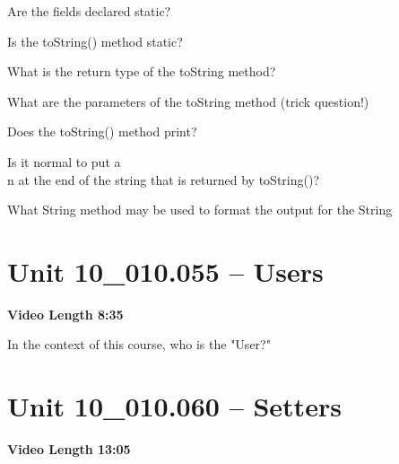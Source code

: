 \documentclass[letterpaper,12pt]{exam}
\newcommand{\unit}{Unit 10}
\begin{document}
\begin{questions}
\begin{samepage}
    \question Are the fields declared static?
    \vspace{5mm}
\end{samepage}

\begin{samepage}
    \question Is the toString() method static?
    \vspace{5mm}
\end{samepage}
\begin{samepage}
    \question What is the return type of the toString method?
    \vspace{5mm}
\end{samepage}
\begin{samepage}
    \question What are the parameters of the toString method (trick question!)
    \vspace{5mm}
\end{samepage}
\begin{samepage}
    \question Does the toString() method print?
    \vspace{5mm}
\end{samepage}
\begin{samepage}
    \question Is it normal to put a \\n at the end of the string that is returned by toString()?
    \vspace{5mm}
\end{samepage}
\begin{samepage}
    \question What String method may be used to format the output for the String
    \vspace{5mm}
\end{samepage}


\section*{\unit\_010.055 -- Users} 
\par{\selectfont\textbf{Video Length  8:35}}

\begin{samepage}
    \question In the context of this course, who is the "User?"
    \vspace{5mm}
\end{samepage}

\section*{\unit\_010.060 -- Setters} 
\par{\selectfont\textbf{Video Length 13:05}}


\end{questions}
\end{document}
